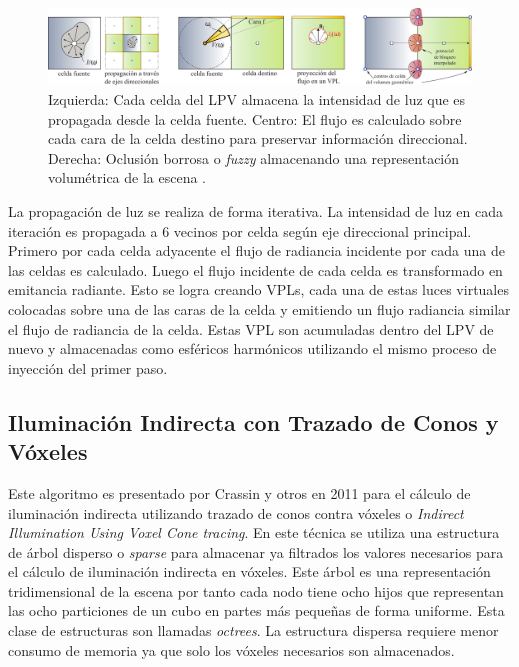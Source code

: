\begin{figure}[H]
	\centering
	\includegraphics[width=\linewidth]{media/lpv_explain.png}
	\caption{Izquierda: Cada celda del \ac{LPV} almacena la intensidad de luz que es propagada desde la celda fuente. Centro: El flujo es calculado sobre cada cara de la celda destino para preservar información direccional. Derecha: Oclusión borrosa o \emph{fuzzy} almacenando una representación volumétrica de la escena \cite{Kaplanyan:2010}.}
	\label{fig:lpv_explain}
\end{figure}

La propagación de luz se realiza de forma iterativa. La intensidad de luz en cada iteración es propagada a 6 vecinos por celda según eje direccional principal. Primero por cada celda adyacente el flujo de radiancia incidente por cada una de las celdas es calculado. Luego el flujo incidente de cada celda es transformado en emitancia radiante. Esto se logra creando \ac{VPL}s, cada una de estas luces virtuales colocadas sobre una de las caras de la celda y emitiendo un flujo radiancia similar el flujo de radiancia de la celda. Estas \ac{VPL} son acumuladas dentro del \ac{LPV} de nuevo y almacenadas como esféricos harmónicos utilizando el mismo proceso de inyección del primer paso. 

\subsection{Iluminación Indirecta con Trazado de Conos y Vóxeles}
Este algoritmo es presentado por Crassin y otros en 2011 \cite{CNSGE11b} para el cálculo de iluminación indirecta utilizando trazado de conos contra vóxeles o \emph{Indirect Illumination Using Voxel Cone tracing}. En este técnica se utiliza una estructura de árbol disperso o \emph{sparse} para almacenar ya filtrados los valores necesarios para el cálculo de iluminación indirecta en vóxeles. Este árbol es una representación tridimensional de la escena por tanto cada nodo tiene ocho hijos que representan las ocho particiones de un cubo en partes más pequeñas de forma uniforme. Esta clase de estructuras son llamadas \emph{octrees}. La estructura dispersa requiere menor consumo de memoria ya que solo los vóxeles necesarios son almacenados.

